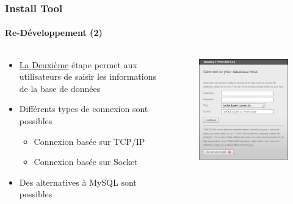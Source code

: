 
\begin{frame}[fragile]
	\frametitle{Install Tool}
	\framesubtitle{Re-Développement (2)}

	\begin{columns}[T]

		\begin{column}{.5\textwidth}
			\begin{itemize}
				\item \underline{La Deuxième} étape permet aux utilisateurs de saisir les informations de la base de données
				\item Différents types de connexion sont possibles
					\begin{itemize}
						\item Connexion basée sur TCP/IP
						\item Connexion basée sur Socket
					\end{itemize}
				\item Des alternatives à MySQL sont possibles
			\end{itemize}
		\end{column}

		\begin{column}{.5\textwidth}
			\begin{figure}\vspace*{-0.4cm}
				\includegraphics[width=0.8\linewidth]{Images/InstallTool/DatabaseConnectionDetails.png}
			\end{figure}
		\end{column}

	\end{columns}

\end{frame}


